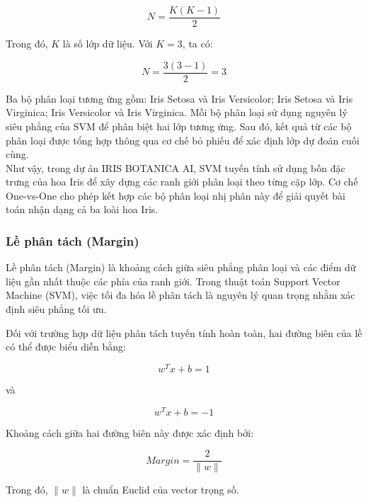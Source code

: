 \documentclass[14pt]{extarticle}
\begin{document}
\[
N=\frac{K(K-1)}{2}
\]

\noindent Trong đó, $K$ là số lớp dữ liệu. Với $K=3$, ta có:

\[
N=\frac{3(3-1)}{2}=3
\]

\noindent Ba bộ phân loại tương ứng gồm: Iris Setosa và Iris Versicolor; Iris Setosa và Iris Virginica; Iris Versicolor và Iris Virginica. Mỗi bộ phân loại sử dụng nguyên lý siêu phẳng của SVM để phân biệt hai lớp tương ứng. Sau đó, kết quả từ các bộ phân loại được tổng hợp thông qua cơ chế bỏ phiếu để xác định lớp dự đoán cuối cùng.\\

\noindent Như vậy, trong dự án IRIS BOTANICA AI, SVM tuyến tính sử dụng bốn đặc trưng của hoa Iris để xây dựng các ranh giới phân loại theo từng cặp lớp. Cơ chế One-vs-One cho phép kết hợp các bộ phân loại nhị phân này để giải quyết bài toán nhận dạng cả ba loài hoa Iris.\\







 	\subsubsection{Lề phân tách (Margin)}
	\noindent
	Lề phân tách (Margin) là khoảng cách giữa siêu phẳng phân loại và các điểm dữ liệu gần nhất thuộc các phía của ranh giới. Trong thuật toán Support Vector Machine (SVM), việc tối đa hóa lề phân tách là nguyên lý quan trọng nhằm xác định siêu phẳng tối ưu.

	
	\noindent
	Đối với trường hợp dữ liệu phân tách tuyến tính hoàn toàn, hai đường biên của lề có thể được biểu diễn bằng:
	
	\begin{equation*}
		w^T x + b = 1
	\end{equation*}
	
	và
	
	\begin{equation*}
		w^T x + b = -1
	\end{equation*}
	
	\noindent
	Khoảng cách giữa hai đường biên này được xác định bởi:
	
	\begin{equation*}
		Margin = \frac{2}{\|w\|}
	\end{equation*}
	
	\noindent
	Trong đó, $\|w\|$ là chuẩn Euclid của vector trọng số.
	
\end{document}
